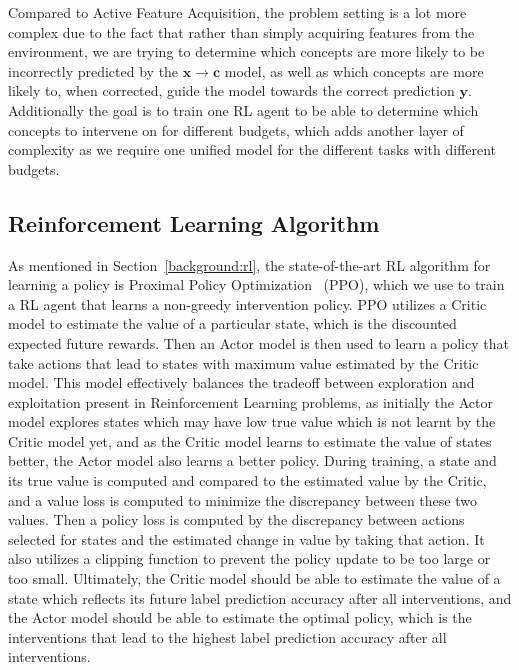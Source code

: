 \documentclass[../main.tex]{subfiles}
\begin{document}
Compared to Active Feature Acquisition, the problem setting is a lot more complex due to the fact that
rather than simply acquiring features from the environment, we are trying to determine
which concepts are more likely to be incorrectly predicted by the $\mathbf{x} \to \mathbf{c}$ model, 
as well as 
which concepts are more likely to, when corrected, guide the model towards the correct prediction
 $\mathbf{y}$.
Additionally the goal is to train one RL agent to be able to determine which concepts
to intervene on for different budgets, which adds another layer of complexity as we require
one unified model for the different tasks with different budgets.

\subsection{Reinforcement Learning Algorithm}

As mentioned in Section~\ref{background:rl}, the state-of-the-art RL algorithm 
for learning
a policy is Proximal Policy Optimization~\cite{ppo} (PPO), which we use
to train a RL agent that learns a non-greedy intervention policy.
PPO utilizes a Critic model to estimate
the value of a particular state, which is the discounted expected future rewards. Then
an Actor model is then used to learn a policy
that take actions that lead to states with maximum value estimated by the
Critic model.
This model effectively balances the tradeoff between exploration and exploitation
present in Reinforcement Learning problems,
as initially the Actor model explores states which may have low true value
which is not learnt by the Critic model yet, and as the Critic model
learns to estimate the value of states better, the Actor model also 
learns a better policy.
During training, a state and its true value is computed
and compared to the estimated value by the Critic, and a value loss is computed to minimize
the discrepancy between these two values. Then a policy loss is computed
by the discrepancy between actions selected for states and the estimated
change in value by taking that action. It also utilizes
a clipping function to prevent the policy update 
to be too large or too small.
Ultimately, the Critic model
should be able to estimate the value of a state which reflects
its future label prediction accuracy after all interventions,
and the Actor model should be able to estimate the optimal policy, 
which is the interventions that lead to the highest label prediction accuracy 
after all interventions.
\end{document}
